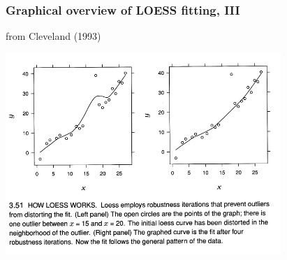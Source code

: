 \documentclass{beamer}
\begin{document}
\begin{frame}
  \frametitle{Graphical overview of LOESS fitting, III}

{\tiny from Cleveland (1993)}
\begin{center}
\includegraphics[height=3in]{loess3.pdf}
\end{center}

\end{frame}
\end{document}
